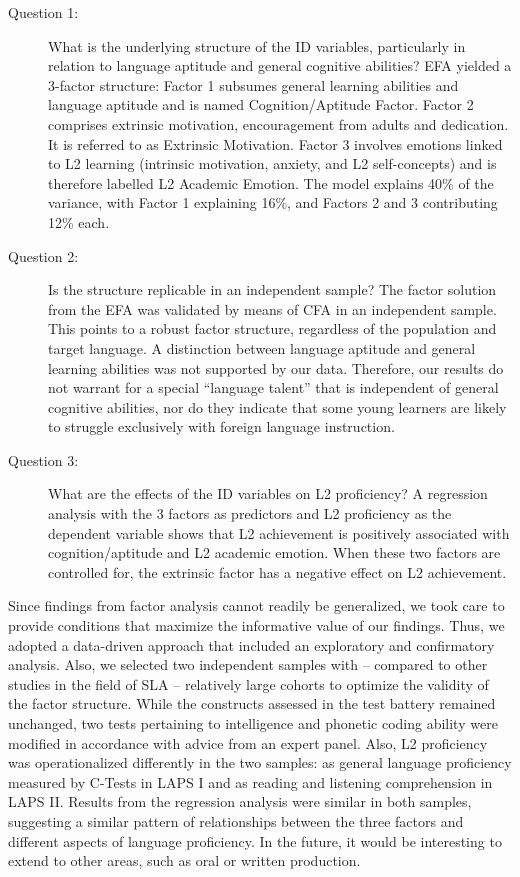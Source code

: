 \documentclass[output=paper]{langsci/langscibook}
\begin{document}
\begin{description}
\item[Question 1:] What is the underlying structure of the ID variables, particularly in relation to language aptitude and general cognitive abilities? EFA yielded a 3-factor structure: Factor 1 subsumes general learning abilities and language aptitude and is named Cognition/Aptitude Factor. Factor 2 comprises extrinsic motivation, encouragement from adults and dedication. It is referred to as Extrinsic Motivation. Factor 3 involves emotions linked to L2 learning (intrinsic motivation, anxiety, and L2 self-concepts) and is therefore labelled L2 Academic Emotion. The model explains 40\% of the variance, with Factor 1 explaining 16\%, and Factors 2 and 3 contributing 12\% each.

\item[Question 2:] Is the structure replicable in an independent sample? The factor solution from the EFA was validated by means of CFA in an independent sample. This points to a robust factor structure, regardless of the population and target language. A distinction between language aptitude and general learning abilities was not supported by our data. Therefore, our results do not warrant for a special “language talent” that is independent of general cognitive abilities, nor do they indicate that some young learners are likely to struggle exclusively with foreign language instruction.

\item[Question 3:] What are the effects of the ID variables on L2 proficiency? A regression analysis with the 3 factors as predictors and L2 proficiency as the dependent variable shows that L2 achievement is positively associated with cognition/aptitude and L2 academic emotion. When these two factors are controlled for, the extrinsic factor has a negative effect on L2 achievement. 
\end{description}

Since findings from factor analysis cannot readily be generalized, we took care to provide conditions that maximize the informative value of our findings. Thus, we adopted a data-driven approach that included an exploratory and confirmatory analysis. Also, we selected two independent samples with – compared to other studies in the field of SLA – relatively large cohorts to optimize the validity of the factor structure. While the constructs assessed in the test battery remained unchanged, two tests pertaining to intelligence and phonetic coding ability were modified in accordance with advice from an expert panel. Also, L2 proficiency was operationalized differently in the two samples: as general language proficiency measured by C-Tests in LAPS I and as reading and listening comprehension in LAPS II. Results from the regression analysis were similar in both samples, suggesting a similar pattern of relationships between the three factors and different aspects of language proficiency. In the future, it would be interesting to extend to other areas, such as oral or written production. 
\end{document}
